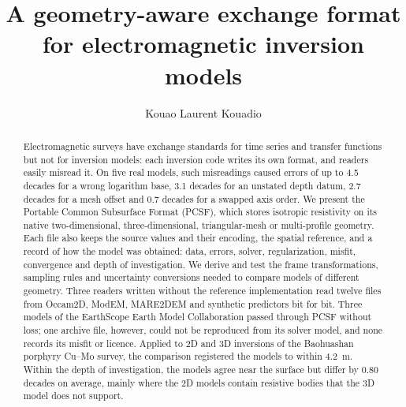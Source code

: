\documentclass[manuscript]{geophysics}
\begin{document}
\title{A geometry-aware exchange format for electromagnetic
inversion models}

\renewcommand{\thefootnote}{\fnsymbol{footnote}}


\address{
\footnotemark[1]Laboratoire des Sciences G\'eographiques, du G\'enie
Civil et des G\'eosciences, \\
Institut National Polytechnique F\'elix Houphou\"et-Boigny, \\
BP 1093, Yamoussoukro, C\^ote d'Ivoire. \\
E-mail: etanoyau@gmail.com}
\author{Kouao Laurent Kouadio\footnotemark[1]}


\maketitle

\begin{abstract}
Electromagnetic surveys have exchange standards for time series and
transfer functions but not for inversion models: each inversion code
writes its own format, and readers easily misread it. On five real
models, such misreadings caused errors of up to 4.5 decades for a
wrong logarithm base, 3.1 decades for an unstated depth datum, 2.7
decades for a mesh offset and 0.7 decades for a swapped axis order. We
present the Portable Common Subsurface Format (PCSF), which stores
isotropic resistivity on its native two-dimensional,
three-dimensional, triangular-mesh or multi-profile geometry. Each
file also keeps the source values and their encoding, the spatial
reference, and a record of how the model was obtained: data, errors,
solver, regularization, misfit, convergence and depth of
investigation. We derive and test the frame transformations, sampling
rules and uncertainty conversions needed to compare models of
different geometry. Three readers written without the reference
implementation read twelve files from Occam2D, ModEM, MARE2DEM and
synthetic predictors bit for bit. Three models of the EarthScope Earth
Model Collaboration passed through PCSF without loss; one archive
file, however, could not be reproduced from its solver model, and
none records its misfit or licence. Applied to 2D and 3D inversions of
the Baohuashan porphyry Cu--Mo survey, the comparison registered the
models to within 4.2~m. Within the depth of investigation, the models
agree near the surface but differ by 0.80 decades on average, mainly
where the 2D models contain resistive bodies that the 3D model does
not support.
\end{abstract}
\end{document}
